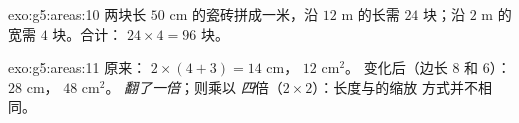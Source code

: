 \begin{solution}{exo:g5:areas:10}
两块长 $50$ cm 的瓷砖拼成一米，沿 $12$ m 的长需
$24$ 块；沿 $2$ m 的宽需 $4$ 块。合计：
$24 \times 4 = 96$ 块。
\end{solution}

\begin{solution}{exo:g5:areas:11}
原来： $2 \times (4 + 3) = 14$ cm， $12$ cm$^2$。
变化后（边长 $8$ 和 $6$）： $28$ cm， $48$ cm$^2$。
\emph{翻了一倍}；则乘以
\emph{四}倍（$2 \times 2$）：长度与的缩放
方式并不相同。
\end{solution}
